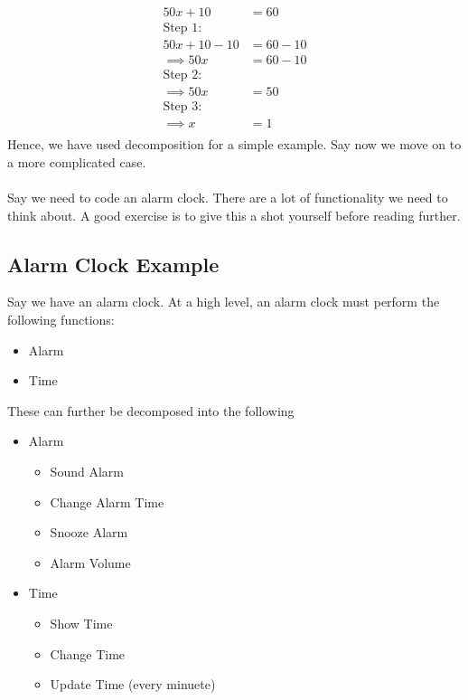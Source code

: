 \documentclass[12pt,a4paper]{book}
\begin{document}
			\begin{align*}
				50x + 10 &= 60 \\
				\text{Step 1}:& \\
				50x + 10 - 10 &= 60 - 10 \\
				\implies 50x &= 60 - 10 \\
				\text{Step 2}:& \\
				\implies 50x &= 50 \\
				\text{Step 3}:& \\
				\implies x &= 1 \\
			\end{align*}
			Hence, we have used decomposition for a simple example. Say now we move on to a more complicated case. \\
			\\
			Say we need to code an alarm clock. There are a lot of functionality we need to think about. A good exercise is to give this a shot yourself before reading further. 

			\subsection{Alarm Clock Example}
				Say we have an alarm clock. At a high level, an alarm clock must perform the following functions:
				\begin{itemize}
					\item Alarm
					\item Time
				\end{itemize}

				These can further be decomposed into the following
				
				\begin{itemize}
					\item Alarm 
						\begin{itemize}
							\item Sound Alarm
							\item Change Alarm Time
							\item Snooze Alarm
							\item Alarm Volume
						\end{itemize}
					\item Time
						\begin{itemize}
							\item Show Time
							\item Change Time
							\item Update Time (every minuete)
						\end{itemize}
				\end{itemize}
\end{document}
